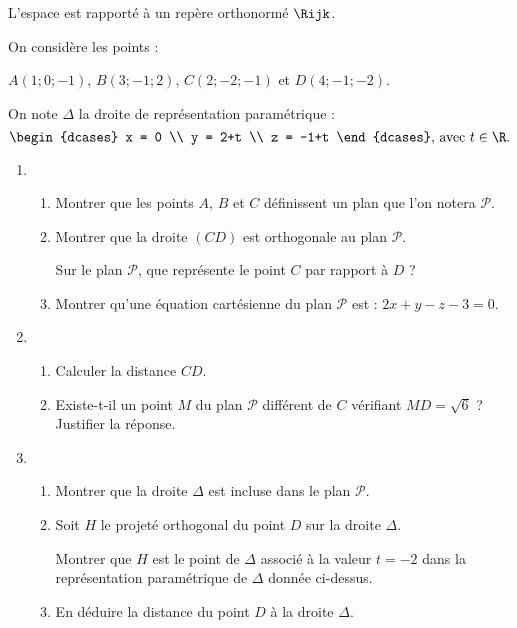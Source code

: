 L’espace est rapporté à un repère orthonormé $\Rijk$.

On considère les points : 

\hfill$A(1;0;-1)$, $B(3;-1;2)$, $C(2;-2;-1)$ et $D(4;-1;-2)$.\hfill~

\smallskip

On note $\Delta$ la droite de représentation paramétrique : \[ \begin{dcases} x = 0 \\ y = 2+t \\ z = -1+t \end{dcases} \text{, avec } t \in \R. \]
%
\begin{enumerate}
	\item 
	\begin{enumerate}
		\item Montrer que les points $A$, $B$ et $C$ définissent un plan que l’on notera $\mathcal{P}$.
		\item Montrer que la droite $(CD)$ est orthogonale au plan $\mathcal{P}$.
		
		Sur le plan $\mathcal{P}$, que représente le point $C$ par rapport à $D$ ?
		\item Montrer qu’une équation cartésienne du plan $\mathcal{P}$ est : $2x+y-z-3 = 0$.
	\end{enumerate}
	\item 
	\begin{enumerate}
		\item Calculer la distance $CD$.
		\item Existe-t-il un point $M$ du plan $\mathcal{P}$ différent de $C$ vérifiant $MD = \sqrt{6}$ ? Justifier la réponse.
	\end{enumerate}
	\item 
	\begin{enumerate}
		\item Montrer que la droite $\Delta$ est incluse dans le plan $\mathcal{P}$.
		\item Soit $H$ le projeté orthogonal du point $D$ sur la droite $\Delta$.
		
		Montrer que $H$ est le point de $\Delta$ associé à la valeur $t = -2$ dans la représentation paramétrique de $\Delta$ donnée ci-dessus.
		\item En déduire la distance du point $D$ à la droite $\Delta$.
	\end{enumerate}
\end{enumerate}
